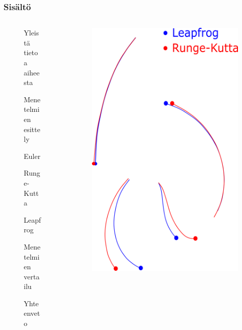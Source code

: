 \documentclass[finnish, 11pt, fleqn]{beamer}
\newcommand{\subitem}[1]{
    {\setlength\itemindent{15pt} \item[-] #1}
}
\begin{document}
\begin{frame}
    \frametitle{Sisältö}
    \begin{columns}[onlytextwidth]
		\begin{column}{.45\textwidth}
			\begin{figure}
				\vspace{-4em}
    			\begin{itemize}
    				\item{Yleistä tietoa aiheesta}
    				\item{Menetelmien esittely}
    					\subitem{Euler}
    					\subitem{Runge-Kutta}
    					\subitem{Leapfrog}
    				\item{Menetelmien vertailu}
    				\item{Yhteenveto}
    			\end{itemize}
			\end{figure}
		\end{column}
		\hfill
		\begin{column}{.45\textwidth}
			\begin{figure}
				\includegraphics[scale=1.5]{graphics/tra_comp1.png}

\end{figure}
\end{column}
\end{columns}
\end{frame}
\end{document}
